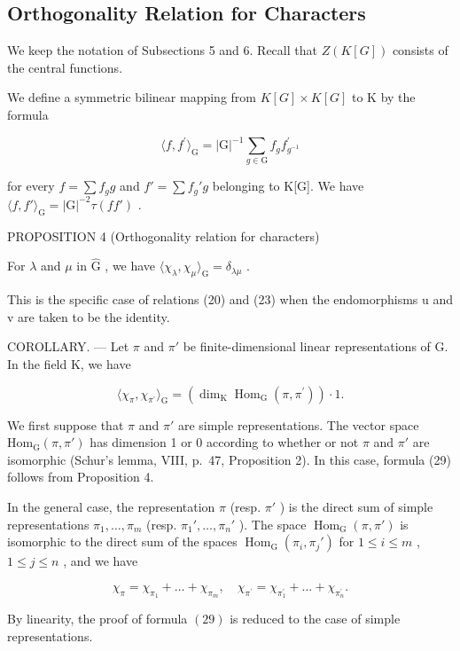 \subsection{Orthogonality Relation for Characters}

We keep the notation of Subsections 5 and 6. Recall that \(Z(K[G])\) consists of the central functions.

We define a symmetric bilinear mapping from \(K[G] \times K[G]\) to K by the formula

\[
\langle f, f ^ {\prime} \rangle_ {\mathrm{G}} = | \mathrm{G} | ^ {- 1} \sum_ {g \in \mathrm{G}} f _ {g} f _ {g ^ {- 1}} ^ {\prime}\tag{28}
\]

for every \(f = \sum f_{g}g\) and \(f' = \sum f_{g}'g\) belonging to K{[}G{]}. We have \(\langle f, f' \rangle_{\mathrm{G}} = |\mathrm{G}|^{-2}\tau (ff')\) .

PROPOSITION 4 (Orthogonality relation for characters)

For \(\lambda\) and \(\mu\) in \(\hat{\mathrm{G}}\) , we have \(\langle \chi_{\lambda},\chi_{\mu}\rangle_{\mathrm{G}} = \delta_{\lambda \mu}\) .

This is the specific case of relations (20) and (23) when the endomorphisms u and v are taken to be the identity.

COROLLARY. --- Let \(\pi\) and \(\pi'\) be finite-dimensional linear representations of G. In the field K, we have

\[
\langle \chi_ {\pi}, \chi_ {\pi^ {\prime}} \rangle_ {\mathrm{G}} = (\dim_ {\mathrm{K}} \operatorname{Hom} _ {\mathrm{G}} (\pi , \pi^ {\prime})) \cdot 1.\tag{29}
\]

We first suppose that \(\pi\) and \(\pi'\) are simple representations. The vector space \(\mathrm{Hom}_{\mathrm{G}}(\pi, \pi')\) has dimension 1 or 0 according to whether or not \(\pi\) and \(\pi'\) are isomorphic (Schur's lemma, VIII, p.~47, Proposition 2). In this case, formula (29) follows from Proposition 4.

In the general case, the representation \(\pi\) (resp. \(\pi'\) ) is the direct sum of simple representations \(\pi_{1},\ldots,\pi_{m}\) (resp. \(\pi_{1}',\ldots,\pi_{n}'\) ). The space \(\operatorname{Hom}_{\mathrm{G}}(\pi,\pi')\) is isomorphic to the direct sum of the spaces \(\operatorname{Hom}_{\mathrm{G}}(\pi_{i},\pi_{j}')\) for \(1\leqslant i\leqslant m\) , \(1\leqslant j\leqslant n\) , and we have

\[
\chi_ {\pi} = \chi_ {\pi_ {1}} + \dots + \chi_ {\pi_ {m}}, \quad \chi_ {\pi^ {\prime}} = \chi_ {\pi_ {1} ^ {\prime}} + \dots + \chi_ {\pi_ {n} ^ {\prime}}.
\]

By linearity, the proof of formula \((29)\) is reduced to the case of simple representations.

